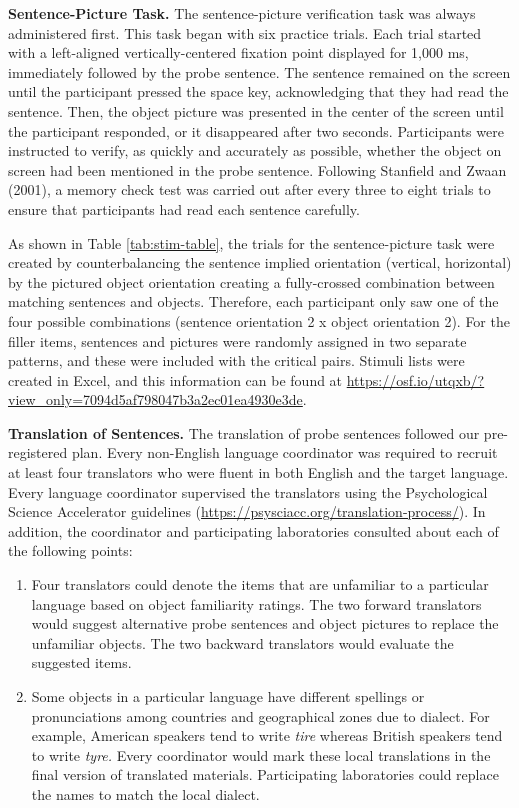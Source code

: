 \documentclass[
  man,floatsintext]{apa7}
\begin{document}
\textbf{Sentence-Picture Task.} The sentence-picture verification task was
always administered first. This task began with six practice trials.
Each trial started with a left-aligned vertically-centered fixation
point displayed for 1,000 ms, immediately followed by the probe
sentence. The sentence remained on the screen until the participant
pressed the space key, acknowledging that they had read the sentence.
Then, the object picture was presented in the center of the screen until
the participant responded, or it disappeared after two seconds.
Participants were instructed to verify, as quickly and accurately as
possible, whether the object on screen had been mentioned in the probe
sentence. Following Stanfield and Zwaan (2001), a memory check test was
carried out after every three to eight trials to ensure that
participants had read each sentence carefully.

As shown in Table \ref{tab:stim-table}, the trials for the
sentence-picture task were created by counterbalancing the sentence
implied orientation (vertical, horizontal) by the pictured object
orientation creating a fully-crossed combination between matching
sentences and objects. Therefore, each participant only saw one of the
four possible combinations (sentence orientation 2 x object orientation
2). For the filler items, sentences and pictures were randomly assigned
in two separate patterns, and these were included with the critical
pairs. Stimuli lists were created in Excel, and this information can be
found at \url{https://osf.io/utqxb/?view_only=7094d5af798047b3a2ec01ea4930e3de}.

\textbf{Translation of Sentences.} The translation of probe sentences
followed our pre-registered plan. Every non-English language coordinator
was required to recruit at least four translators who were fluent in
both English and the target language. Every language coordinator
supervised the translators using the Psychological Science Accelerator
guidelines (\url{https://psysciacc.org/translation-process/}). In addition,
the coordinator and participating laboratories consulted about each of
the following points:

\begin{enumerate}
\def\labelenumi{\arabic{enumi})}
\item
  Four translators could denote the items that are unfamiliar to a
  particular language based on object familiarity ratings. The two
  forward translators would suggest alternative probe sentences and
  object pictures to replace the unfamiliar objects. The two backward
  translators would evaluate the suggested items.
\item
  Some objects in a particular language have different spellings or
  pronunciations among countries and geographical zones due to
  dialect. For example, American speakers tend to write \emph{tire} whereas
  British speakers tend to write \emph{tyre.} Every coordinator would mark
  these local translations in the final version of translated
  materials. Participating laboratories could replace the names to
  match the local dialect.
\end{enumerate}
\end{document}
